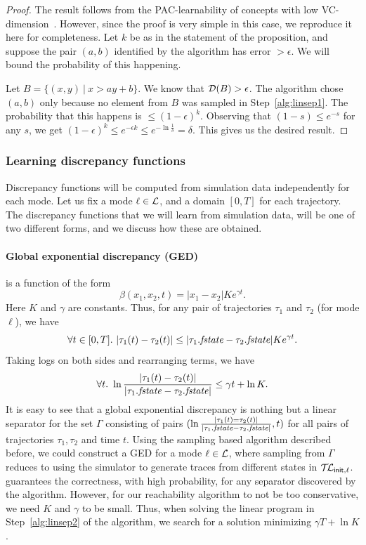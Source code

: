 \begin{proof}
The result follows from the PAC-learnability of concepts with low
VC-dimension~\cite{KearnsVazirani}. However, since the proof is very
simple in this case, we reproduce it here for completeness. Let $k$ be
as in the statement of the proposition, and suppose the pair $(a,b)$
identified by the algorithm has error $> \epsilon$. We will bound the
probability of this happening.

Let $B = \{(x,y)\: |\: x > ay+b\}$. We know that ${\cal D}(B) >
\epsilon$. The algorithm chose $(a,b)$ only because no element from
$B$ was sampled in Step~\ref{alg:linsep1}. The probability that this
happens is $\leq (1-\epsilon)^k$. Observing that $(1-s) \leq e^{-s}$
for any $s$, we get $(1-\epsilon)^k \leq e^{-\epsilon k} \leq e^{-\ln
  \frac{1}{\delta}} = \delta$.  This gives us the desired result.
\end{proof}


\subsubsection{Learning discrepancy functions}
Discrepancy functions will be computed from simulation data
independently for each mode. Let us fix a mode $\ell \in \L$, and a
domain $[0,T]$ for each trajectory. The discrepancy functions that we
will learn from simulation data, will be one of two different forms,
and we discuss how these are obtained.

\vspace{-10pt}
\paragraph{Global exponential discrepancy (GED)} is a function of the form
\[
\beta(x_1,x_2,t) = |x_1 - x_2| Ke^{\gamma t}.
\]
Here $K$ and $\gamma$ are constants. Thus, for any pair of
trajectories $\tau_1$ and $\tau_2$ (for mode $\ell$), we have
\[
\forall t \in [0,T].\ |\tau_1(t) - \tau_2(t)| \leq |\tau_1.\fstate -
\tau_2.\fstate| Ke^{\gamma t}.
\]
Taking logs on both sides and rearranging terms, we have
\[
\forall t.\ \ln \frac{|\tau_1(t) - \tau_2(t)|}{|\tau_1.\fstate -
\tau_2.\fstate|} \leq \gamma t + \ln K.
\]
It is easy to see that a global exponential discrepancy is nothing but
a linear separator for the set $\Gamma$ consisting of pairs $(\ln
\frac{|\tau_1(t) = \tau_2(t)|}{|\tau_1.\fstate - \tau_2.\fstate|}, t)$
for all pairs of trajectories $\tau_1,\tau_2$ and time $t$. Using the
sampling based algorithm described before, we could construct a GED for a mode $\ell \in \L$, where sampling from
$\Gamma$ reduces to using the simulator to generate traces from
different states in $\TL_{\sf init, \ell}$. 
guarantees the correctness, with high probability, for any separator
discovered by the algorithm.  However, for our reachability algorithm
to not be too conservative, we need $K$ and $\gamma$ to be
small. Thus, when solving the linear program in Step~\ref{alg:linsep2}
of the algorithm, we search for a solution minimizing  $\gamma T +
\ln K$.

